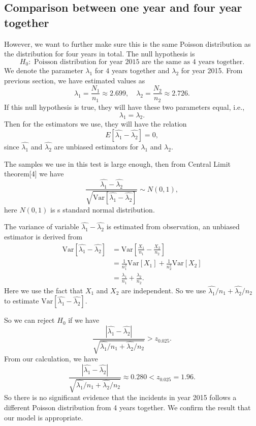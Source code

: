 \documentclass[11pt,a4paper,english]{article}
\begin{document}
\subsection{Comparison between one year and four year together}
However, we want to further make sure this is the same Poisson distribution as the distribution for four years in total. The null hypothesis is 
\[H_{0}:\text{ Poisson distribution for year 2015 are the same as 4 years together.}\]
We denote the parameter $\lambda_{1}$ for 4 years together and $\lambda_{2}$ for year 2015. From previous section, we have estimated values as
\[\lambda_{1} = \frac{N_{1}}{n_{1}} \approx 2.699,\quad \lambda_{2} = \frac{N_{2}}{n_{2}} \approx 2.726.\]
If this null hypothesis is true, they will have these two parameters equal, i.e.,
\begin{equation*}
	\lambda_{1} = \lambda_{2}.
\end{equation*}
Then for the estimators we use, they will have the relation
\begin{equation*}
	E[\hat{\lambda_{1}}-\hat{\lambda_{2}}] = 0,
\end{equation*}
since $\hat{\lambda_{1}}$ and $\hat{\lambda_{2}}$ are unbiased estimators for $\lambda_{1}$ and $\lambda_{2}$.

The samples we use in this test is large enough, then from Central Limit theorem[4] we have
\begin{equation*}
	\frac{\hat{\lambda_{1}} - \hat{\lambda_{2}}}{\sqrt{\text{Var}\left[\hat{\lambda_{1}} - \hat{\lambda_{2}}\right]}}
	\sim N(0, 1),
\end{equation*}
here $N(0,1)$ is s standard normal distribution.

The variance of variable $\hat{\lambda_{1}}-\hat{\lambda_{2}}$ is estimated from observation, an unbiased estimator is derived from
\begin{align*}
	\text{Var}\left[\hat{\lambda_{1}} - \hat{\lambda_{2}}\right]
	&= \text{Var}\left[\frac{X_{1}}{n_{1}} - \frac{X_{2}}{n_{2}}\right] \\
	&= \frac{1}{n_{1}^{2}}\text{Var}[X_{1}]
	+ \frac{1}{n_{2}^{2}}\text{Var}[X_{2}] \\
	&= \frac{\lambda_{1}}{n_{1}} + \frac{\lambda_{2}}{n_{2}}.
\end{align*}
Here we use the fact that $X_{1}$ and $X_{2}$ are independent. So we use $\hat{\lambda_{1}}/{n_{1}} + \hat{\lambda_{2}}/{n_{2}}$ to estimate $\text{Var}\left[\hat{\lambda_{1}}-\hat{\lambda_{2}}\right]$.

So we can reject $H_{0}$ if we have 
\[\frac{|\hat{\lambda_{1}}-\hat{\lambda_{2}}|}{\sqrt{\hat{\lambda_{1}}/{n_{1}} + \hat{\lambda_{2}}/{n_{2}}}} > z_{0.025}.\]
From our calculation, we have 
\begin{equation*}
	\frac{|\hat{\lambda_{1}}-\hat{\lambda_{2}}|}{\sqrt{\hat{\lambda_{1}}/{n_{1}} + \hat{\lambda_{2}}/{n_{2}}}} \approx 0.280 < z_{0.025} = 1.96.
\end{equation*}
So there is no significant evidence that the incidents in year 2015 follows a different Poisson distribution from 4 years together. We confirm the result that our model is appropriate.
\end{document}
